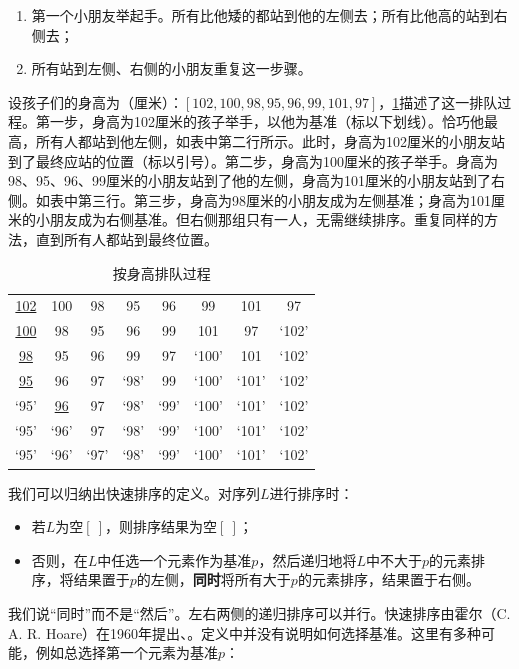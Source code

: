 \documentclass[b5paper]{ctexart}
\begin{document}
\begin{enumerate}
  \item 第一个小朋友举起手。所有比他矮的都站到他的左侧去；所有比他高的站到右侧去；
  \item 所有站到左侧、右侧的小朋友重复这一步骤。
\end{enumerate}

设孩子们的身高为（厘米）：$[102, 100, 98, 95, 96, 99, 101, 97]$，\cref{tab:kids-sort}描述了这一排队过程。第一步，身高为102厘米的孩子举手，以他为基准（标以下划线）。恰巧他最高，所有人都站到他左侧，如表中第二行所示。此时，身高为102厘米的小朋友站到了最终应站的位置（标以引号）。第二步，身高为100厘米的孩子举手。身高为98、95、96、99厘米的小朋友站到了他的左侧，身高为101厘米的小朋友站到了右侧。如表中第三行。第三步，身高为98厘米的小朋友成为左侧基准；身高为101厘米的小朋友成为右侧基准。但右侧那组只有一人，无需继续排序。重复同样的方法，直到所有人都站到最终位置。

\begin{table}[htbp]
\centering
\begin{tabular}{ | c c c c c c c c |}
\hline
\underline{102} & 100 & 98 & 95 & 96 & 99 & 101 & 97 \\
\underline{100} & 98 & 95 & 96 & 99 & 101 & 97 & `102' \\
\underline{98} & 95 & 96 & 99 & 97 & `100' & 101 & `102' \\
\underline{95} & 96 & 97 & `98' & 99 & `100' & `101' & `102' \\
`95' & \underline{96} & 97 & `98' & `99' & `100' & `101' & `102' \\
`95' & `96' & 97 & `98' & `99' & `100' & `101' & `102' \\
`95' & `96' & `97' & `98' & `99' & `100' & `101' & `102' \\
\hline
\end{tabular}
\caption{按身高排队过程}
\label{tab:kids-sort}
\end{table}

我们可以归纳出快速排序的定义。对序列$L$进行排序时：

\begin{itemize}
\item 若$L$为空$[\ ]$，则排序结果为空$[\ ]$；
\item 否则，在$L$中任选一个元素作为基准$p$，然后递归地将$L$中不大于$p$的元素排序，将结果置于$p$的左侧，\textbf{同时}将所有大于$p$的元素排序，结果置于右侧。
\end{itemize}

我们说“同时”而不是“然后”。左右两侧的递归排序可以并行。快速排序由霍尔（C. A. R. Hoare）在1960年提出\cite{TAOCP}、\cite{wiki-qs}。定义中并没有说明如何选择基准。这里有多种可能，例如总选择第一个元素为基准$p$：
\end{document}
